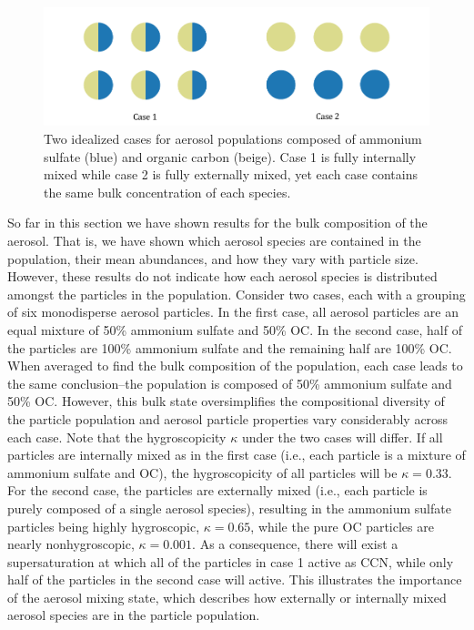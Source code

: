 \begin{figure}[!t]
  \centering
    \includegraphics[width=\textwidth]{figures/chapter5/mixing-state-ideal-cases.pdf}
    \caption{Two idealized cases for aerosol populations composed of ammonium sulfate (blue) and organic carbon (beige). Case 1 is fully internally mixed while case 2 is fully externally mixed, yet each case contains the same bulk concentration of each species.}
    \label{fig:mixing-state-scenarios}
\end{figure}

So far in this section we have shown results for the bulk composition of the aerosol. That is, we have shown which aerosol species are contained in the population, their mean abundances, and how they vary with particle size. However, these results do not indicate how each aerosol species is distributed amongst the particles in the population. Consider two cases, each with a grouping of six monodisperse aerosol particles. In the first case, all aerosol particles are an equal mixture of 50\% ammonium sulfate and 50\% OC. In the second case, half of the particles are 100\% ammonium sulfate and the remaining half are 100\% OC. When averaged to find the bulk composition of the population, each case leads to the same conclusion--the population is composed of 50\% ammonium sulfate and 50\% OC. However, this bulk state oversimplifies the compositional diversity of the particle population and aerosol particle properties vary considerably across each case. Note that the hygroscopicity $\kappa$ under the two cases will differ. If all particles are internally mixed as in the first case (i.e., each particle is a mixture of ammonium sulfate and OC), the hygroscopicity of all particles will be $\kappa=0.33$. For the second case, the particles are externally mixed (i.e., each particle is purely composed of a single aerosol species), resulting in the ammonium sulfate particles being highly hygroscopic, $\kappa=0.65$, while the pure OC particles are nearly nonhygroscopic, $\kappa=0.001$. As a consequence, there will exist a supersaturation at which all of the particles in case 1 active as CCN, while only half of the particles in the second case will active. This illustrates the importance of the aerosol mixing state, which describes how externally or internally mixed aerosol species are in the particle population. 

